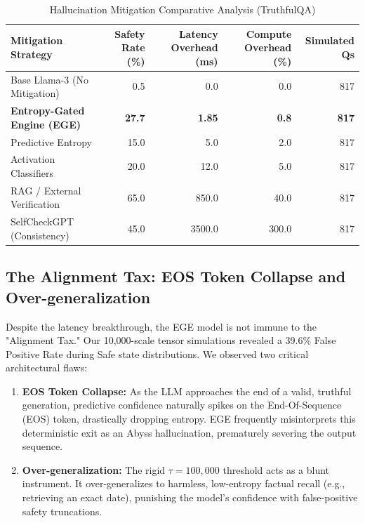 \documentclass[conference,compsoc]{IEEEtran}
\begin{document}
\begin{table}[htbp]
\centering
\caption{Hallucination Mitigation Comparative Analysis (TruthfulQA)}
\label{tab:comparison}
\begin{tabular}{@{}lrrrr@{}}
\toprule
\textbf{Mitigation Strategy} & \textbf{Safety Rate (\%)} & \textbf{Latency Overhead (ms)} & \textbf{Compute Overhead (\%)} & \textbf{Simulated Qs} \\ \midrule
Base Llama-3 (No Mitigation)   & 0.5                      & 0.0                            & 0.0                            & 817                   \\
\textbf{Entropy-Gated Engine (EGE)}     & \textbf{27.7}            & \textbf{1.85}                  & \textbf{0.8}                   & \textbf{817}          \\
Predictive Entropy             & 15.0                     & 5.0                            & 2.0                            & 817                   \\
Activation Classifiers         & 20.0                     & 12.0                           & 5.0                            & 817                   \\
RAG / External Verification    & 65.0                     & 850.0                          & 40.0                           & 817                   \\
SelfCheckGPT (Consistency)     & 45.0                     & 3500.0                         & 300.0                          & 817                   \\ \bottomrule
\end{tabular}
\end{table}

\subsection{The Alignment Tax: EOS Token Collapse and Over-generalization}
Despite the latency breakthrough, the EGE model is not immune to the "Alignment Tax." Our 10,000-scale tensor simulations revealed a 39.6\% False Positive Rate during Safe state distributions. We observed two critical architectural flaws:
\begin{enumerate}
    \item \textbf{EOS Token Collapse:} As the LLM approaches the end of a valid, truthful generation, predictive confidence naturally spikes on the End-Of-Sequence (EOS) token, drastically dropping entropy. EGE frequently misinterprets this deterministic exit as an Abyss hallucination, prematurely severing the output sequence.
    \item \textbf{Over-generalization:} The rigid $\tau = 100,000$ threshold acts as a blunt instrument. It over-generalizes to harmless, low-entropy factual recall (e.g., retrieving an exact date), punishing the model's confidence with false-positive safety truncations.
\end{enumerate}
\end{document}
